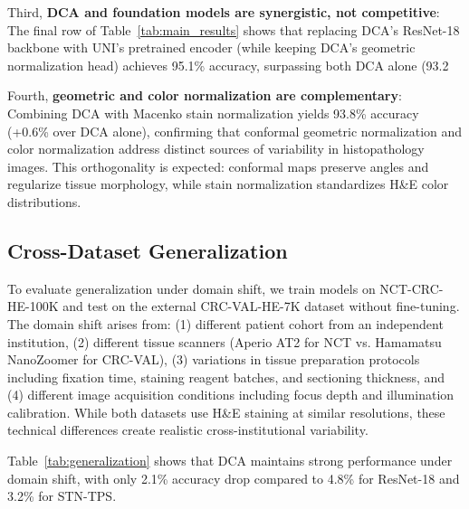 \documentclass[10pt,journal,compsoc]{IEEEtran}
\begin{document}
Third, \textbf{DCA and foundation models are synergistic, not competitive}: The final row of Table~\ref{tab:main_results} shows that replacing DCA's ResNet-18 backbone with UNI's pretrained encoder (while keeping DCA's geometric normalization head) achieves 95.1\% accuracy, surpassing both DCA alone (93.2%

Fourth, \textbf{geometric and color normalization are complementary}: Combining DCA with Macenko stain normalization yields 93.8\% accuracy (+0.6\% over DCA alone), confirming that conformal geometric normalization and color normalization address distinct sources of variability in histopathology images. This orthogonality is expected: conformal maps preserve angles and regularize tissue morphology, while stain normalization standardizes H\&E color distributions.

\subsection{Cross-Dataset Generalization}

To evaluate generalization under domain shift, we train models on NCT-CRC-HE-100K and test on the external CRC-VAL-HE-7K dataset without fine-tuning. The domain shift arises from: (1) different patient cohort from an independent institution, (2) different tissue scanners (Aperio AT2 for NCT vs. Hamamatsu NanoZoomer for CRC-VAL), (3) variations in tissue preparation protocols including fixation time, staining reagent batches, and sectioning thickness, and (4) different image acquisition conditions including focus depth and illumination calibration. While both datasets use H\&E staining at similar resolutions, these technical differences create realistic cross-institutional variability.

Table~\ref{tab:generalization} shows that DCA maintains strong performance under domain shift, with only 2.1\% accuracy drop compared to 4.8\% for ResNet-18 and 3.2\% for STN-TPS.
\end{document}
